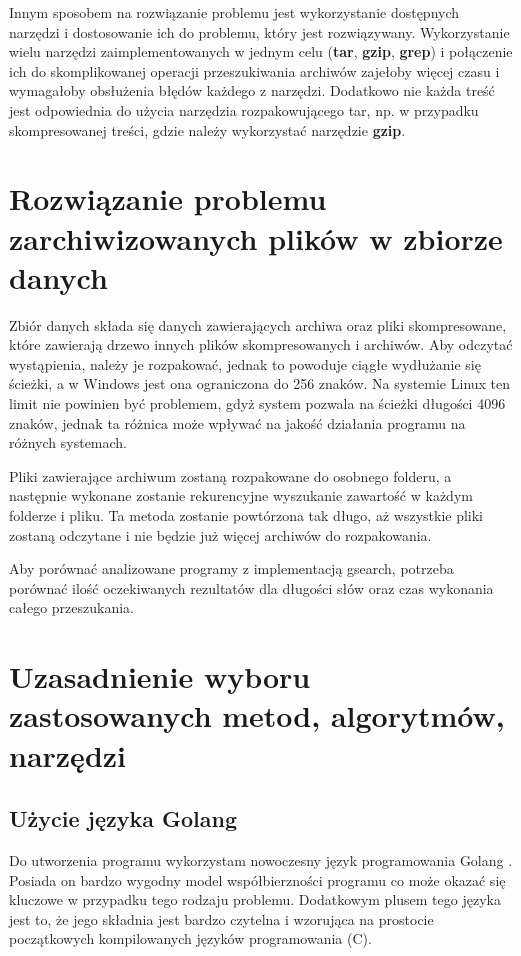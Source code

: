 Innym sposobem na rozwiązanie problemu jest wykorzystanie dostępnych narzędzi i
dostosowanie ich do problemu, który jest rozwiązywany. Wykorzystanie wielu narzędzi
zaimplementowanych w jednym celu (\textbf{tar}, \textbf{gzip}, \textbf{grep}) i połączenie ich do 
skomplikowanej operacji przeszukiwania archiwów zajełoby więcej czasu
i wymagałoby obsłużenia błędów każdego z narzędzi. Dodatkowo nie każda treść
jest odpowiednia do użycia narzędzia rozpakowującego tar, np. w przypadku 
skompresowanej treści, gdzie należy wykorzystać narzędzie \textbf{gzip}.

\section{Rozwiązanie problemu zarchiwizowanych plików w zbiorze danych}

Zbiór danych składa się danych zawierających archiwa oraz pliki skompresowane,
które zawierają drzewo innych plików skompresowanych i archiwów.
Aby odczytać wystąpienia, należy je rozpakować, jednak to powoduje ciągłe 
wydłużanie się ścieżki, a w Windows jest ona ograniczona do 256 znaków. Na 
systemie Linux ten limit nie powinien być problemem, gdyż system pozwala na 
ścieżki długości 4096 znaków, jednak ta różnica może wpływać na jakość działania
programu na różnych systemach.

Pliki zawierające archiwum zostaną rozpakowane do osobnego folderu, a następnie
wykonane zostanie rekurencyjne wyszukanie zawartość w każdym folderze i pliku.
Ta metoda zostanie powtórzona tak długo, aż wszystkie pliki zostaną odczytane 
i nie będzie już więcej archiwów do rozpakowania.

Aby porównać analizowane programy z implementacją gsearch, potrzeba porównać
ilość oczekiwanych rezultatów dla długości słów oraz czas wykonania całego 
przeszukania.

\section{Uzasadnienie wyboru zastosowanych metod, algorytmów, narzędzi}

\subsection{Użycie języka Golang}

Do utworzenia programu wykorzystam nowoczesny język programowania Golang \cite{bib:internet:golang}.
Posiada on bardzo wygodny model współbierzności programu co może okazać się 
kluczowe w przypadku tego rodzaju problemu. Dodatkowym plusem tego języka jest
to, że jego składnia jest bardzo czytelna i wzorująca na prostocie początkowych
kompilowanych języków programowania (C).

